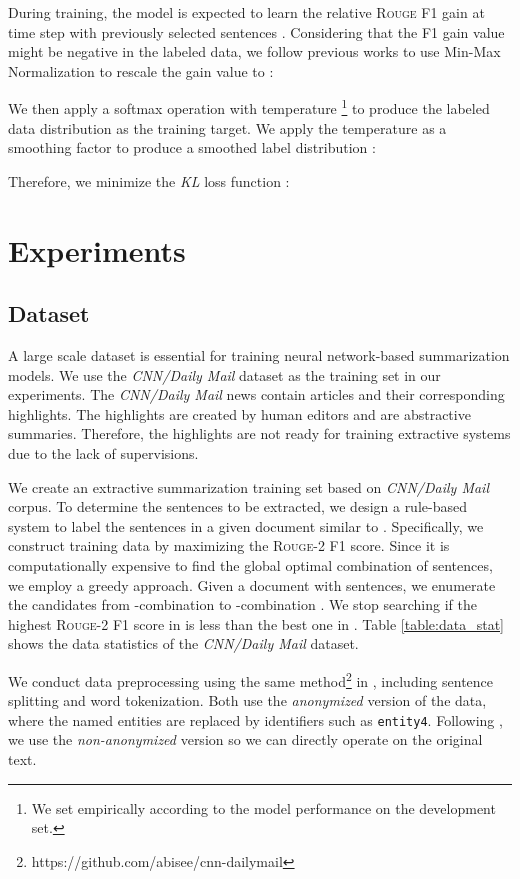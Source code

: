 \documentclass[11pt,a4paper]{article}
\newcommand{\cnndm}{\textit{CNN/Daily Mail}}
\begin{document}
During training, the model is expected to learn the relative \textsc{Rouge} F1 gain at time step  with previously selected sentences .
Considering that the F1 gain value might be negative in the labeled data, we follow previous works \citep{Ren:2017:LCS:3077136.3080792} to use Min-Max Normalization to rescale the gain value to :

We then apply a softmax operation with temperature  \citep{hinton2015distilling} \footnote{We set  empirically according to the model performance on the development set. } to produce the labeled data distribution  as the training target.
We apply the temperature  as a smoothing factor to produce a smoothed label distribution : 


Therefore, we minimize the \textit{KL} loss function :


 \section{Experiments}

\subsection{Dataset}
\label{sec:dataset}
A large scale dataset is essential for training neural network-based summarization models.
We use the \cnndm{} dataset \citep{hermann2015teaching, nallapatiabstractive} as the training set in our experiments.
The \cnndm{} news contain articles and their corresponding highlights.
The highlights are created by human editors and are abstractive summaries.
Therefore, the highlights are not ready for training extractive systems due to the lack of supervisions.



We create an extractive summarization training set based on \textit{CNN/Daily Mail} corpus.
To determine the sentences to be extracted, we design a rule-based system to label the sentences in a given document similar to \citet{nallapati2017summarunner}.
Specifically, we construct training data by maximizing the \textsc{Rouge}-2 F1 score.
Since it is computationally expensive to find the global optimal combination of sentences, we employ a greedy approach.
Given a document with  sentences, we enumerate the candidates from -combination  to -combination .
We stop searching if the highest \textsc{Rouge}-2 F1 score in  is less than the best one in .
Table \ref*{table:data_stat} shows the data statistics of the \cnndm{} dataset.

We conduct data preprocessing using the same method\footnote{https://github.com/abisee/cnn-dailymail} in \citet{see-liu-manning:2017:Long}, including sentence splitting and word tokenization.
Both \citet{nallapatiabstractive,nallapati2017summarunner} use the \textit{anonymized} version of the data, where the named entities are replaced by identifiers such as \texttt{entity4}.
Following \citet{see-liu-manning:2017:Long}, we use the \textit{non-anonymized} version so we can directly operate on the original text.
\end{document}
